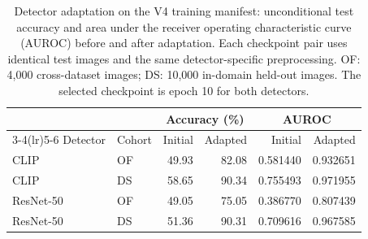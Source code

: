 \begin{table}[t]
\caption{Detector adaptation on the V4 training manifest: unconditional test accuracy and area under the receiver operating characteristic curve (AUROC) before and after adaptation. Each checkpoint pair uses identical test images and the same detector-specific preprocessing. OF: 4,000 cross-dataset images; DS: 10,000 in-domain held-out images. The selected checkpoint is epoch 10 for both detectors.}
\label{tab:adapted_detectors}
\centering\small
\begin{tabular}{llrrrr}
\toprule
 & & \multicolumn{2}{c}{Accuracy (\%)} & \multicolumn{2}{c}{AUROC} \\
\cmidrule(lr){3-4}\cmidrule(lr){5-6}
Detector & Cohort & Initial & Adapted & Initial & Adapted \\
\midrule
CLIP & OF & 49.93 & 82.08 & 0.581440 & 0.932651 \\
CLIP & DS & 58.65 & 90.34 & 0.755493 & 0.971955 \\
ResNet-50 & OF & 49.05 & 75.05 & 0.386770 & 0.807439 \\
ResNet-50 & DS & 51.36 & 90.31 & 0.709616 & 0.967585 \\
\bottomrule
\end{tabular}
\end{table}
